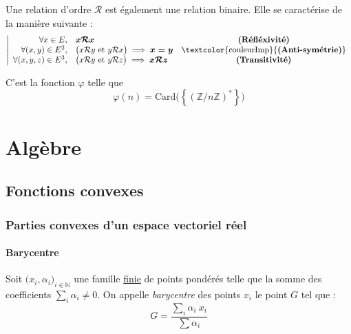 \documentclass[11pt,a4paper,fleqn,pdftex]{report}
\begin{document}
\begin{dfn}
Une relation d'ordre $\mathcal{R}$ est également une relation binaire. Elle se caractérise de la manière suivante : 
\begin{equation}
\left|
\begin{array}{r l c}
\forall x \in E,& \boldsymbol{x\mathcal{R}x} & \text{\textbf{(Réfléxivité)}}\\
\forall (x,y) \in E^2, & \big( x\mathcal{R}y \text{ et } y\mathcal{R}x \big) \implies \boldsymbol{x=y} & \text{\textcolor{couleurImp}{\textbf{(Anti-symétrie)}}}\\
\forall (x,y,z) \in E^3, & \big( x\mathcal{R}y \text{ et } y\mathcal{R}z \big) \implies \boldsymbol{x\mathcal{R}z} & \text{\textbf{(Transitivité)}}
\end{array}
\right.
\end{equation}
\end{dfn}




\begin{theorem}
C'est la fonction $\varphi$ telle que 
\[
    \varphi (n) = \mathrm{Card}\big( \left\lbrace \left( \mathbb{Z} / n \mathbb{Z} \right) ^{*} \right\rbrace \big)
\]
\end{theorem}

\part{Algèbre}
\chapter{Fonctions convexes} %
\label{cha:fonctions_convexes}
\section{Parties convexes d'un espace vectoriel réel} %
\label{sec:parties_convexes_d_un_ev}
\subsection{Barycentre} %
\label{sub:barycentre}
\begin{dfn}[Barycentre]
     Soit $\big( x_i,\alpha_i\big)_{i\in \mathbb{N}}$ une famille \uline{finie} de points pondérés telle que la somme des coefficients $\sum_i \alpha_i \neq 0$. On appelle \emph{barycentre} des points $x_i$ le point $G$ tel que : 
     \begin{equation}
     G = \dfrac{\displaystyle\sum_i \alpha_i~x_i}{\sum \alpha_i}
     \end{equation}
\end{dfn}
\end{document}
